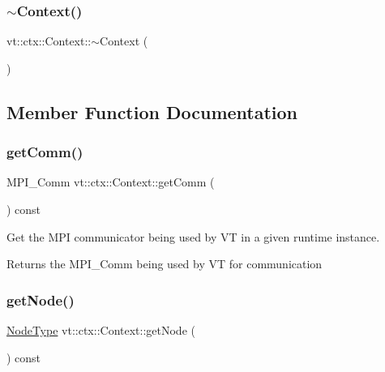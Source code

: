 \subsubsection{\texorpdfstring{$\sim$\+Context()}{~Context()}}
{\footnotesize\ttfamily vt\+::ctx\+::\+Context\+::$\sim$\+Context (\begin{DoxyParamCaption}{ }\end{DoxyParamCaption})}



\subsection{Member Function Documentation}
\mbox{\label{structvt_1_1ctx_1_1_context_a2d4378c97824792991a3410449cf19db}} 
\subsubsection{\texorpdfstring{get\+Comm()}{getComm()}}
{\footnotesize\ttfamily M\+P\+I\+\_\+\+Comm vt\+::ctx\+::\+Context\+::get\+Comm (\begin{DoxyParamCaption}{ }\end{DoxyParamCaption}) const\hspace{0.3cm}{\ttfamily [inline]}}



Get the M\+PI communicator being used by VT in a given runtime instance. 

\begin{DoxyReturn}{Returns}
the {\ttfamily M\+P\+I\+\_\+\+Comm} being used by VT for communication 
\end{DoxyReturn}
\mbox{\label{structvt_1_1ctx_1_1_context_a0d52c263ce8516546a67443d9a86fa5f}} 
\subsubsection{\texorpdfstring{get\+Node()}{getNode()}}
{\footnotesize\ttfamily \hyperlink{namespacevt_a866da9d0efc19c0a1ce79e9e492f47e2}{Node\+Type} vt\+::ctx\+::\+Context\+::get\+Node (\begin{DoxyParamCaption}{ }\end{DoxyParamCaption}) const\hspace{0.3cm}{\ttfamily [inline]}}



